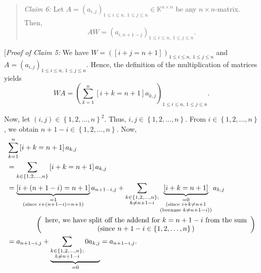 \documentclass[paper=a4, fontsize=12pt]{scrartcl}%
\let\sumnonlimits\sum
\renewcommand{\sum}{\sumnonlimits\limits}
\theoremstyle{plainsl}
\theoremstyle{definition}
\theoremstyle{remark}
\newenvironment{statement}{\begin{quote}}{\end{quote}}
\begin{document}
\begin{statement}
\textit{Claim 6:} Let $A=\left(  a_{i,j}\right)  _{1\leq i\leq n,\ 1\leq j\leq
n}\in\mathbb{K}^{n\times n}$ be any $n\times n$-matrix. Then,%
\[
AW=\left(  a_{i,n+1-j}\right)  _{1\leq i\leq n,\ 1\leq j\leq n}.
\]

\end{statement}

[\textit{Proof of Claim 5:} We have $W=\left(  \left[  i+j=n+1\right]
\right)  _{1\leq i\leq n,\ 1\leq j\leq n}$ and $A=\left(  a_{i,j}\right)
_{1\leq i\leq n,\ 1\leq j\leq n}$. Hence, the definition of the multiplication
of matrices yields%
\begin{equation}
WA=\left(  \sum_{k=1}^{n}\left[  i+k=n+1\right]  a_{k,j}\right)  _{1\leq i\leq
n,\ 1\leq j\leq n}. \label{sol.ring.matrix.W-conj.b.c5.pf.1}%
\end{equation}


Now, let $\left(  i,j\right)  \in\left\{  1,2,\ldots,n\right\}  ^{2}$. Thus,
$i,j\in\left\{  1,2,\ldots,n\right\}  $. From $i\in\left\{  1,2,\ldots
,n\right\}  $, we obtain $n+1-i\in\left\{  1,2,\ldots,n\right\}  $. Now,%
\begin{align}
&  \sum_{k=1}^{n}\left[  i+k=n+1\right]  a_{k,j}\nonumber\\
&  =\sum_{k\in\left\{  1,2,\ldots,n\right\}  }\left[  i+k=n+1\right]
a_{k,j}\nonumber\\
&  =\underbrace{\left[  i+\left(  n+1-i\right)  =n+1\right]  }%
_{\substack{=1\\\text{(since }i+\left(  n+1-i\right)  =n+1\text{)}%
}}a_{n+1-i,j}+\sum_{\substack{k\in\left\{  1,2,\ldots,n\right\}  ;\\k\neq
n+1-i}}\underbrace{\left[  i+k=n+1\right]  }_{\substack{=0\\\text{(since
}i+k\neq n+1\\\text{(because }k\neq n+1-i\text{))}}}a_{k,j}\nonumber\\
&  \qquad\qquad\left(
\begin{array}
[c]{c}%
\text{here, we have split off the addend for }k=n+1-i\text{ from the sum}\\
\text{(since }n+1-i\in\left\{  1,2,\ldots,n\right\}  \text{)}%
\end{array}
\right) \nonumber\\
&  =a_{n+1-i,j}+\underbrace{\sum_{\substack{k\in\left\{  1,2,\ldots,n\right\}
;\\k\neq n+1-i}}0a_{k,j}}_{=0}=a_{n+1-i,j}.
\label{sol.ring.matrix.W-conj.b.c5.pf.2}%
\end{align}
\end{document}
